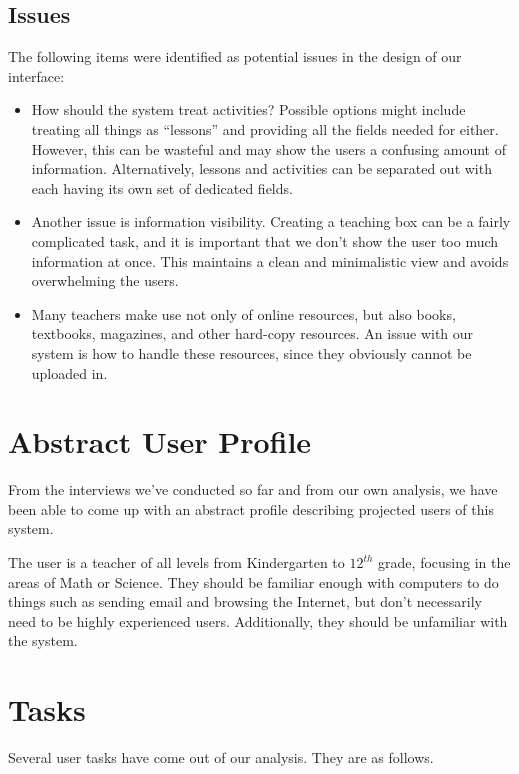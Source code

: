 \documentclass[12pt,titlepage]{article}
\begin{document}
\subsection{Issues}

The following items were identified as potential issues in the design of our
interface:

\begin{itemize}
\item How should the system treat activities?  Possible options might include
      treating all things as ``lessons'' and providing all the fields needed
      for either.  However, this can be wasteful and may show the users a
      confusing amount of information.  Alternatively, lessons and activities
      can be separated out with each having its own set of dedicated fields.

\item Another issue is information visibility.  Creating a teaching box can be
      a fairly complicated task, and it is important that we don't show the
      user too much information at once.  This maintains a clean and minimalistic
      view and avoids overwhelming the users.

\item Many teachers make use not only of online resources, but also books,
      textbooks, magazines, and other hard-copy resources.  An issue with our
      system is how to handle these resources, since they obviously cannot be
      uploaded in.
\end{itemize}

\section{Abstract User Profile}
From the interviews we've conducted so far and from our own analysis, we have
been able to come up with an abstract profile describing projected users of this
system.

The user is a teacher of all levels from Kindergarten to $12^{th}$ grade, focusing
in the areas of Math or Science.  They should be familiar enough with computers to
do things such as sending email and browsing the Internet, but don't necessarily need
to be highly experienced users.  Additionally, they should be unfamiliar with the
system.

\section{Tasks}
Several user tasks have come out of our analysis.  They are as follows.
\end{document}
